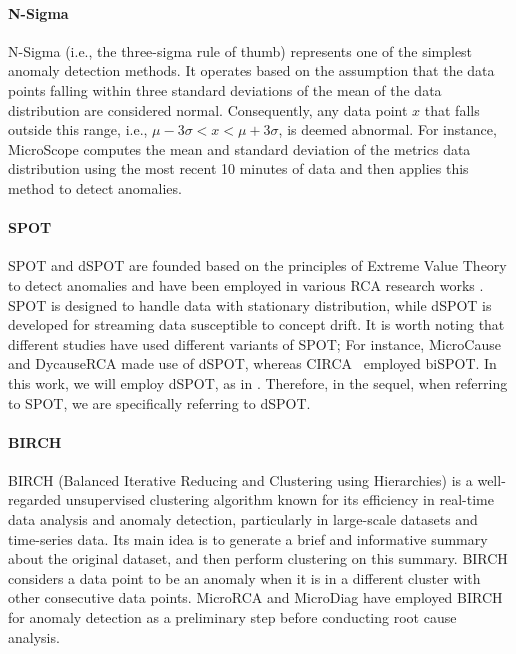 \paragraph{N-Sigma}
N-Sigma (i.e., the three-sigma rule of thumb) represents one of the simplest anomaly detection methods. It operates based on the assumption that the data points falling within three standard deviations of the mean of the data distribution are considered normal. Consequently, any data point $x$ that falls outside this range, i.e., $\mu - 3\sigma < x < \mu + 3\sigma$, is deemed abnormal. For instance, MicroScope \cite{Jinjin2018Microscope} computes the mean and standard deviation of the metrics data distribution using the most recent 10 minutes of data and then applies this method to detect anomalies.

\vspace{-0.2cm}
\paragraph{SPOT}
SPOT and dSPOT \cite{siffer2017anomaly} are founded based on the principles of Extreme Value Theory \cite{Coles2001EVT} to detect anomalies and have been employed in various RCA research works \cite{pan2021dycauserca, Li2022Circa, lee2023eadro, Meng2020Microcause}. SPOT is designed to handle data with stationary distribution, while dSPOT is developed for streaming data susceptible to concept drift. It is worth noting that different studies have used different variants of SPOT; For instance, MicroCause \cite{Meng2020Microcause} and DycauseRCA \cite{pan2021dycauserca} made use of dSPOT, whereas CIRCA~\cite{Li2022Circa} employed biSPOT. In this work, we will employ dSPOT, as in \cite{Meng2020Microcause, pan2021dycauserca}. Therefore, in the sequel, when referring to SPOT, we are specifically referring to dSPOT. 

\vspace{-0.2cm}
\paragraph{BIRCH}
BIRCH (Balanced Iterative Reducing and Clustering using Hierarchies) \cite{zhang1996birch} is a well-regarded unsupervised clustering algorithm known for its efficiency in real-time data analysis and anomaly detection, particularly in large-scale datasets and time-series data. Its main idea is to generate a brief and informative summary about the original dataset, and then perform clustering on this summary. BIRCH considers a data point to be an anomaly when it is in a different cluster with other consecutive data points. MicroRCA \cite{wu2020microrca} and MicroDiag \cite{wu2021microdiag} have employed BIRCH for anomaly detection as a preliminary step before conducting root cause analysis.

